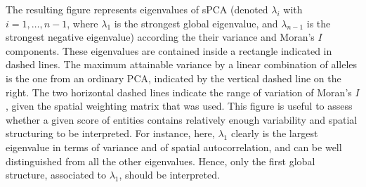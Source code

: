 \documentclass{article}
\begin{document}
\noindent The resulting figure represents eigenvalues of sPCA (denoted
$\lambda_i$ with $i=1,\ldots,n-1$, where $\lambda_1$ is the strongest
global eigenvalue, and $\lambda_{n-1}$ is the strongest negative
eigenvalue) according the their variance and Moran's $I$ components.
These eigenvalues are contained inside a rectangle indicated in dashed
lines.
The maximum attainable variance by a linear combination of alleles is
the one from an ordinary PCA, indicated by the vertical dashed line on
the right.
The two horizontal dashed lines indicate the range of variation of
Moran's $I$, given the spatial weighting matrix that was used.
This figure is useful to assess whether a given score of entities contains
relatively enough variability and spatial structuring to be interpreted.
For instance, here, $\lambda_1$ clearly is the largest eigenvalue in
terms of variance and of spatial autocorrelation, and can be well
distinguished from all the other eigenvalues.
Hence, only the first global structure, associated to $\lambda_1$, should be interpreted.
\\
\end{document}
